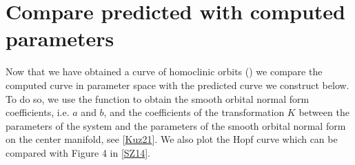 \documentclass[letterpaper,10pt,english]{jupyterBook}
\begin{document}
\section{Compare predicted with computed parameters}
\label{\detokenize{SIRmodel:compare-predicted-with-computed-parameters}}
\sphinxAtStartPar
Now that we have obtained a curve of homoclinic orbits () we
compare the computed curve in parameter space with the predicted curve we
construct below. To do so, we use the function  to obtain the
smooth orbital normal form coefficients, i.e. \(a\) and \(b\), and the coefficients
of the transformation \(K\) between the parameters of the system and the parameters
of the smooth orbital normal form on the center manifold, see
{[}\hyperlink{cite.references:id3}{Kuz21}{]}. We also plot the Hopf curve which can be compared with
Figure 4 in {[}\hyperlink{cite.references:id20}{SZ14}{]}.
\end{document}
